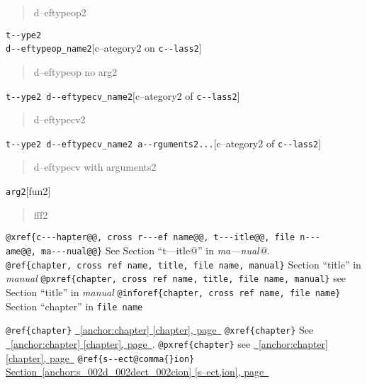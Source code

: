 \documentclass{book}
\begin{document}
\begin{titlepage}
%
\begin{quote}
\unskip{\parskip=0pt\noindent}%
d--eftypeop2
\end{quote}

\noindent\texttt{t{-}{-}ype2\leavevmode{}\\d{-}{-}eftypeop\_name2}\hfill[c--ategory2 on \texttt{c{-}{-}lass2}]

%
\begin{quote}
\unskip{\parskip=0pt\noindent}%
d--eftypeop no arg2
\end{quote}

\noindent\texttt{t{-}{-}ype2 d{-}{-}eftypecv\_name2}\hfill[c--ategory2 of \texttt{c{-}{-}lass2}]

%
\begin{quote}
\unskip{\parskip=0pt\noindent}%
d--eftypecv2
\end{quote}

\noindent\texttt{t{-}{-}ype2 d{-}{-}eftypecv\_name2 a{-}{-}rguments2...}\hfill[c--ategory2 of \texttt{c{-}{-}lass2}]

%
\begin{quote}
\unskip{\parskip=0pt\noindent}%
d--eftypecv with arguments2
\end{quote}

\noindent\texttt{arg2}\hfill[fun2]

%
\begin{quote}
\unskip{\parskip=0pt\noindent}%
fff2
\end{quote}


\texttt{@xref\{c{-}{-}{-}hapter@@,\ cross r{-}{-}{-}ef name@@,\ t{-}{-}{-}itle@@,\ file n{-}{-}{-}ame@@,\ ma{-}{-}{-}nual@@\}} See Section ``t---itle@'' in \textsl{ma---nual@}.
\texttt{@ref\{chapter,\ cross ref name,\ title,\ file name,\ manual\}} Section ``title'' in \textsl{manual}
\texttt{@pxref\{chapter,\ cross ref name,\ title,\ file name,\ manual\}} see Section ``title'' in \textsl{manual}
\texttt{@inforef\{chapter,\ cross ref name,\ file name\}} Section ``chapter'' in \texttt{file name}

\texttt{@ref\{chapter\}} \hyperref[anchor:chapter]{\chaptername~\ref*{anchor:chapter} [chapter], page~\pageref*{anchor:chapter}}
\texttt{@xref\{chapter\}} See \hyperref[anchor:chapter]{\chaptername~\ref*{anchor:chapter} [chapter], page~\pageref*{anchor:chapter}}.
\texttt{@pxref\{chapter\}} see \hyperref[anchor:chapter]{\chaptername~\ref*{anchor:chapter} [chapter], page~\pageref*{anchor:chapter}}
\texttt{@ref\{s{-}{-}ect@comma\{\}ion\}} \hyperref[anchor:s_002d_002dect_002cion]{Section~\ref*{anchor:s_002d_002dect_002cion} [s--ect,ion], page~\pageref*{anchor:s_002d_002dect_002cion}}


\end{titlepage}
\end{document}

